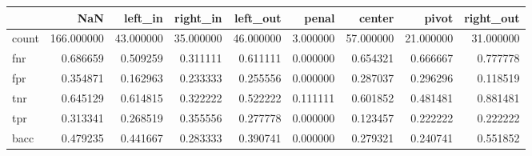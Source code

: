 \begin{tabular}{lrrrrrrrr}
\toprule
{} &         NaN &    left\_in &   right\_in &   left\_out &     penal &     center &      pivot &  right\_out \\
\midrule
count &  166.000000 &  43.000000 &  35.000000 &  46.000000 &  3.000000 &  57.000000 &  21.000000 &  31.000000 \\
fnr   &    0.686659 &   0.509259 &   0.311111 &   0.611111 &  0.000000 &   0.654321 &   0.666667 &   0.777778 \\
fpr   &    0.354871 &   0.162963 &   0.233333 &   0.255556 &  0.000000 &   0.287037 &   0.296296 &   0.118519 \\
tnr   &    0.645129 &   0.614815 &   0.322222 &   0.522222 &  0.111111 &   0.601852 &   0.481481 &   0.881481 \\
tpr   &    0.313341 &   0.268519 &   0.355556 &   0.277778 &  0.000000 &   0.123457 &   0.222222 &   0.222222 \\
bacc  &    0.479235 &   0.441667 &   0.283333 &   0.390741 &  0.000000 &   0.279321 &   0.240741 &   0.551852 \\
\bottomrule
\end{tabular}

